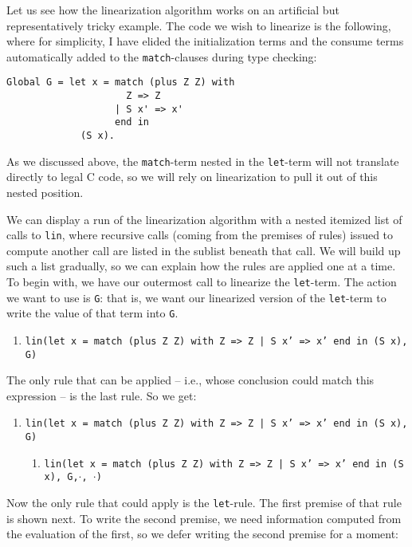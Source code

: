 \documentclass{book}[12pt]
\begin{document}
Let us see how the linearization algorithm works on an artificial but
representatively tricky example.  The code we wish to linearize is the
following, where for simplicity, I have elided the initialization
terms and the consume terms automatically added to the
\texttt{match}-clauses during type checking:

\begin{verbatim}
Global G = let x = match (plus Z Z) with 
                     Z => Z
                   | S x' => x'
                   end in
             (S x).
\end{verbatim}

\noindent As we discussed above, the \texttt{match}-term nested in the
\texttt{let}-term will not translate directly to legal C code, so we
will rely on linearization to pull it out of this nested position.

We can display a run of the linearization algorithm with a nested
itemized list of calls to \texttt{lin}, where recursive calls (coming
from the premises of rules) issued to compute another call are listed
in the sublist beneath that call.  We will build up such a list
gradually, so we can explain how the rules are applied one at a time.
To begin with, we have our outermost call to linearize the
\texttt{let}-term.  The action we want to use is \texttt{G}: that is, we want
our linearized version of the \texttt{let}-term to write the value of
that term into \texttt{G}.

{\small
\begin{enumerate}
\item \texttt{lin(let x = match (plus Z Z) with Z => Z | S x' => x' end in (S x), G)}
\end{enumerate}
}

\noindent The only rule that can be applied -- i.e., whose conclusion
could match this expression -- is the last rule.  So we get:

{\small
\begin{enumerate}
\item \texttt{lin(let x = match (plus Z Z) with Z => Z | S x' => x' end in (S x), G)}
\begin{enumerate}
\item \texttt{lin(let x = match (plus Z Z) with Z => Z | S x' => x' end in (S x), G,}$\cdot$\texttt{, }$\cdot$\texttt{)}
\end{enumerate}
\end{enumerate}
}

\noindent Now the only rule that could apply is the \texttt{let}-rule.
The first premise of that rule is shown next.  To write the second
premise, we need information computed from the evaluation of the
first, so we defer writing the second premise for a moment:
\end{document}
